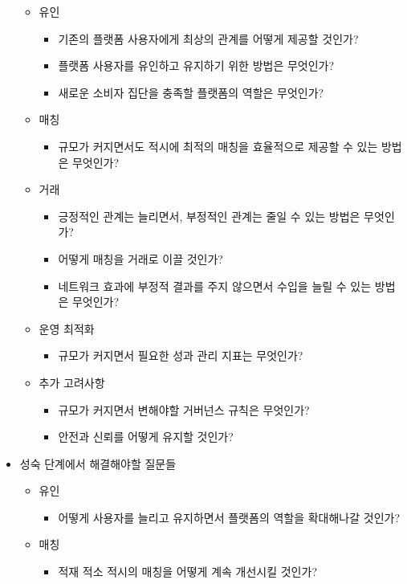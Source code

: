 \begin{itemize}
	\begin{itemize}
	\item 유인
		\begin{itemize}
		\item 기존의 플랫폼 사용자에게 최상의 관계를 어떻게 제공할 것인가?
		\item 플랫폼 사용자를 유인하고 유지하기 위한 방법은 무엇인가?
		\item 새로운 소비자 집단을 충족할 플랫폼의 역할은 무엇인가?
		\end{itemize}
	\item 매칭
		\begin{itemize}
		\item 규모가 커지면서도 적시에 최적의 매칭을 효율적으로 제공할 수 있는 방법은 무엇인가?
		\end{itemize}	
	\item 거래
		\begin{itemize}
		\item 긍정적인 관계는 늘리면서, 부정적인 관계는 줄일 수 있는 방법은 무엇인가?
		\item 어떻게 매칭을 거래로 이끌 것인가?
		\item 네트워크 효과에 부정적 결과를 주지 않으면서 수입을 늘릴 수 있는 방법은 무엇인가?
		\end{itemize}	
	\item 운영 최적화	
		\begin{itemize}
		\item 규모가 커지면서 필요한 성과 관리 지표는 무엇인가?
		\end{itemize}	
	\item 추가 고려사항
		\begin{itemize}
		\item 규모가 커지면서 변해야할 거버넌스 규칙은 무엇인가?
		\item 안전과 신뢰를 어떻게 유지할 것인가?
		\end{itemize}
	\end{itemize}	
\item 성숙 단계에서 해결해야할 질문들 	\cite[ch. 10]{Reillier:2017tt}
	\begin{itemize}
	\item 유인
		\begin{itemize}
		\item 어떻게 사용자를 늘리고 유지하면서 플랫폼의 역할을 확대해나갈 것인가?
		\end{itemize}
	\item 매칭
		\begin{itemize}
		\item 적재 적소 적시의 매칭을 어떻게 계속 개선시킬 것인가?

\end{itemize}
\end{itemize}
\end{itemize}
